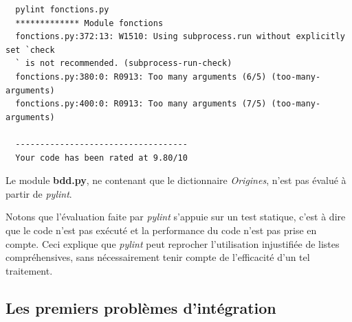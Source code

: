 \documentclass[twoside,a4paper,11pt,frenchb,openany]{report}
\begin{document}
\begin{verbatim}  pylint fonctions.py
  ************* Module fonctions
  fonctions.py:372:13: W1510: Using subprocess.run without explicitly set `check
  ` is not recommended. (subprocess-run-check)
  fonctions.py:380:0: R0913: Too many arguments (6/5) (too-many-arguments)
  fonctions.py:400:0: R0913: Too many arguments (7/5) (too-many-arguments)

  -----------------------------------
  Your code has been rated at 9.80/10\end{verbatim}

Le module \textbf{bdd.py}, ne contenant que le dictionnaire \textit{Origines}, n'est pas évalué à partir de \textit{pylint}.

Notons que l'évaluation faite par \textit{pylint} s'appuie sur un test statique, c'est à dire que le code n'est pas exécuté et la performance du code n'est pas prise en compte. Ceci explique que \textit{pylint} peut reprocher l'utilisation injustifiée de listes compréhensives, sans nécessairement tenir compte de l'efficacité d'un tel traitement.




\subsection{Les premiers problèmes d'intégration}
\end{document}
